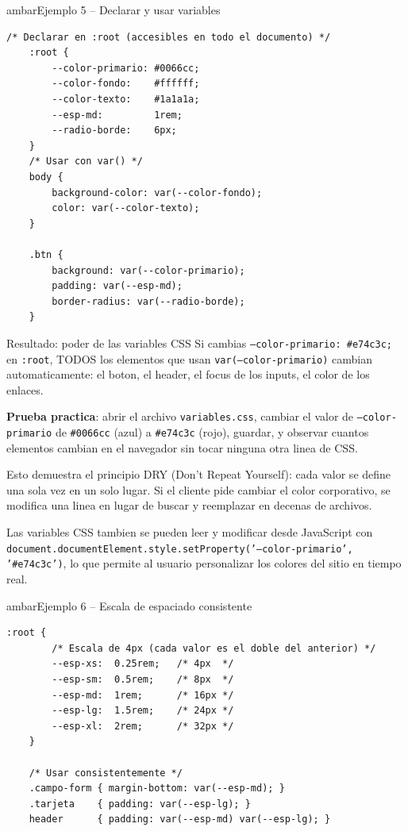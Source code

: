 \documentclass[11pt,a4paper]{article}
\begin{document}
	\begin{cajacodigo}{ambar}{Ejemplo 5 -- Declarar y usar variables}
		\begin{lstlisting}[style=codecss]
	/* Declarar en :root (accesibles en todo el documento) */
	:root {
		--color-primario: #0066cc;
		--color-fondo:    #ffffff;
		--color-texto:    #1a1a1a;
		--esp-md:         1rem;
		--radio-borde:    6px;
	}
	/* Usar con var() */
	body {
		background-color: var(--color-fondo);
		color: var(--color-texto);
	}
	
	.btn {
		background: var(--color-primario);
		padding: var(--esp-md);
		border-radius: var(--radio-borde);
	}\end{lstlisting}
	\end{cajacodigo}
	
	\begin{cajaresultado}{Resultado: poder de las variables CSS}
		Si cambias \texttt{---color-primario: \#e74c3c;} en \texttt{:root}, TODOS los elementos que usan \texttt{var(---color-primario)} cambian automaticamente: el boton, el header, el focus de los inputs, el color de los enlaces.
		
		\textbf{Prueba practica}: abrir el archivo \texttt{variables.css}, cambiar el valor de \texttt{---color-primario} de \texttt{\#0066cc} (azul) a \texttt{\#e74c3c} (rojo), guardar, y observar cuantos elementos cambian en el navegador sin tocar ninguna otra linea de CSS.
		
		Esto demuestra el principio DRY (Don't Repeat Yourself): cada valor se define una sola vez en un solo lugar. Si el cliente pide cambiar el color corporativo, se modifica una linea en lugar de buscar y reemplazar en decenas de archivos.
		
		Las variables CSS tambien se pueden leer y modificar desde JavaScript con \texttt{document.documentElement.style.setProperty('---color-primario', '\#e74c3c')}, lo que permite al usuario personalizar los colores del sitio en tiempo real.
	\end{cajaresultado}
	
	\begin{cajacodigo}{ambar}{Ejemplo 6 -- Escala de espaciado consistente}
		\begin{lstlisting}[style=codecss]
	:root {
		/* Escala de 4px (cada valor es el doble del anterior) */
		--esp-xs:  0.25rem;   /* 4px  */
		--esp-sm:  0.5rem;    /* 8px  */
		--esp-md:  1rem;      /* 16px */
		--esp-lg:  1.5rem;    /* 24px */
		--esp-xl:  2rem;      /* 32px */
	}
	
	/* Usar consistentemente */
	.campo-form { margin-bottom: var(--esp-md); }
	.tarjeta    { padding: var(--esp-lg); }
	header      { padding: var(--esp-md) var(--esp-lg); } \end{lstlisting}
	\end{cajacodigo}
	
\end{document}

